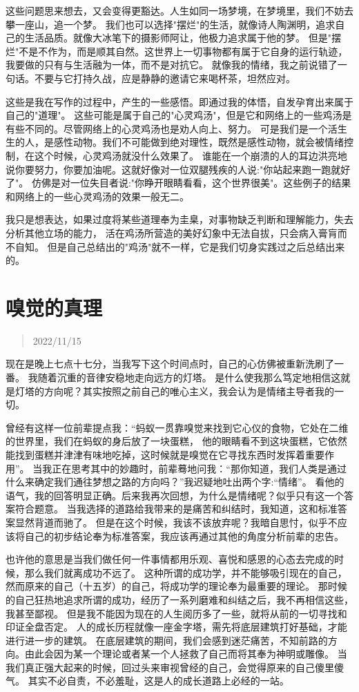 \documentclass[cn,12pt]{elegantbook}
\begin{document}
这些问题思来想去，又会变得更豁达。人生如同一场梦境，在梦境里，我们不妨去攀一座山，追一个梦。
我们也可以选择"摆烂"的生活，就像诗人陶渊明，追求自己的生活品质。就像大冰笔下的摄影师阿让，他极力追求属于他的梦。
但是"摆烂"不是不作为，而是顺其自然。这世界上一切事物都有属于它自身的运行轨迹，我要做的只有与生活融为一体，而不是对抗它。
就像我的情绪，我之前说错了一句话。不要与它打持久战，应是静静的邀请它来喝杯茶，坦然应对。

这些是我在写作的过程中，产生的一些感悟。即通过我的体悟，自发孕育出来属于自己的"道理"。
这些可能是属于自己的"心灵鸡汤"，但是它和网络上的一些鸡汤是有些不同的。尽管网络上的心灵鸡汤也是劝人向上、努力。
可是我们是一个活生生的人，是感性动物。我们不可能做到绝对理性，既然是感性动物，就会被情绪控制，在这个时候，心灵鸡汤就没什么效果了。
谁能在一个崩溃的人的耳边洪亮地说你要努力，你要加油呢。这就好像对一位双腿残疾的人说:"你站起来跑一跑就好了"。
仿佛是对一位失目者说:"你睁开眼睛看看，这个世界很美"。这些例子的结果和网络上的一些心灵鸡汤的效果一般无二。

我只是想表达，如果过度将某些道理奉为圭臬，对事物缺乏判断和理解能力，失去分析其他立场的能力，
活在鸡汤所营造的美好幻象中无法自拔，只会病入膏肓而不自知。
但是自己总结出的"鸡汤"就不一样，它是我们切身实践过之后总结出来的。

\newpage
\section{嗅觉的真理}
\begin{quotation}
  2022/11/15
\end{quotation}

现在是晚上七点十七分，当我写下这个时间点时，自己的心仿佛被重新洗刷了一番。
我随着沉重的音律安稳地走向远方的灯塔。
是什么使我那么笃定地相信这就是灯塔的方向呢？其实按照之前自己的唯心主义，我会认为是情绪主导者我的一切。

曾经有这样一位前辈提点我：“蚂蚁一贯靠嗅觉来找到它心仪的食物，它处在二维的世界里，我们在蚂蚁的身后放了一块蛋糕，
他的眼睛看不到这块蛋糕，它依然能找到蛋糕并津津有味地吃掉，这时候就是嗅觉在它寻找东西时发挥着重要作用”。
当我正在思考其中的妙趣时，前辈蓦地问我：“那你知道，我们人类是通过什么来确定我们通往梦想之路的方向吗？”我迟疑地吐出两个字:“情绪”。
看他的语气，我的回答明显正确。后来我再次回想，为什么是情绪呢？似乎只有这一个答案符合题意。
当我选择的道路给我带来的是痛苦和纠结时，我知道，这和标准答案显然背道而驰了。
但是在这个时候，我该不该放弃呢？我暗自思忖，似乎不应该将自己的初步结论奉为标准答案，我应该再通过其他的角度分析前辈的忠告。

也许他的意思是当我们做任何一件事情都用乐观、喜悦和感恩的心态去完成的时候，那么我们就离成功不远了。
这种所谓的成功学，并不能够吸引现在的自己，然而原来的自己（十五岁）的自己，将成功学的理论奉为最重要的理论。
那时候的自己狂热地追求所谓的成功，经历了一系列磨难和纠结之后，我不再相信这些，我甚至鄙视。
但是我不能因为现在的人生阅历多了一些，就将从前的一切寻找和印证全盘否定。
人的成长历程就像一座金字塔，需先将底层建筑打好基础，才能进行进一步的建筑。
在底层建筑的期间，我们会感到迷茫痛苦，不知前路的方向。由此会因为某一个理论或者某一个人拯救了自己而将其奉为神明或雕像。
当我们真正强大起来的时候，回过头来审视曾经的自己，会觉得原来的自己傻里傻气。
其实不必自责，不必羞耻，这是人的成长道路上必经的一站。
\end{document}

